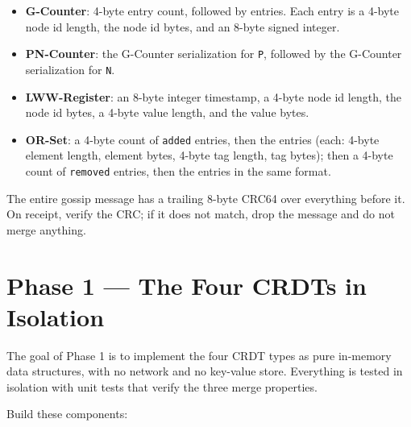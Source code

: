 \documentclass[11pt,a4paper]{article}
\begin{document}
\begin{itemize}
\item \textbf{G-Counter}: 4-byte entry count, followed by entries. Each entry is a 4-byte node id length, the node id bytes, and an 8-byte signed integer.

\item \textbf{PN-Counter}: the G-Counter serialization for \texttt{P}, followed by the G-Counter serialization for \texttt{N}.

\item \textbf{LWW-Register}: an 8-byte integer timestamp, a 4-byte node id length, the node id bytes, a 4-byte value length, and the value bytes.

\item \textbf{OR-Set}: a 4-byte count of \texttt{added} entries, then the entries (each: 4-byte element length, element bytes, 4-byte tag length, tag bytes); then a 4-byte count of \texttt{removed} entries, then the entries in the same format.
\end{itemize}

The entire gossip message has a trailing 8-byte CRC64 over everything before it. On receipt, verify the CRC; if it does not match, drop the message and do not merge anything.

\section{Phase 1 --- The Four CRDTs in Isolation}

The goal of Phase 1 is to implement the four CRDT types as pure in-memory data structures, with no network and no key-value store. Everything is tested in isolation with unit tests that verify the three merge properties.

Build these components:
\end{document}
